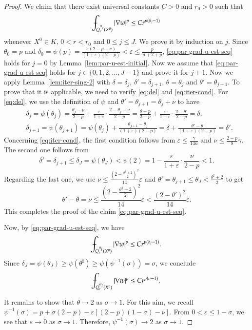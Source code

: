 \documentclass[11pt,oneside,english]{amsart}
\newcommand{\e}{\varepsilon}
\newcommand{\de}{\delta}
\newcommand{\D}{\nabla}
\numberwithin{equation}{section}
\def\Xint#1{\mathchoice
  {\XXint\displaystyle\textstyle{#1}}%
  {\XXint\textstyle\scriptstyle{#1}}%
  {\XXint\scriptstyle\scriptscriptstyle{#1}}%
  {\XXint\scriptscriptstyle\scriptscriptstyle{#1}}%
  \!\int}
\def\XXint#1#2#3{{\setbox0=\hbox{$#1{#2#3}{\int}$}
    \vcenter{\hbox{$#2#3$}}\kern-.5\wd0}}
\def\dashint{\Xint-}
\theoremstyle{plain}
\numberwithin{equation}{section}
\begin{document}
\begin{proof}
We claim that there exist universal constants $C>0$ and $r_0>0$ such that
\begin{align}
    \label{eq:par-grad-u-est-seq}
    \dashint_{Q_r^{\theta_j}(X^0)}|\D w|^p\le Cr^{p(\de_j-1)}
\end{align}
whenever $X^0\in K$, $0<r< r_0$ and $0\le j\le J$. We prove it by induction on $j$. Since $\theta_0=p$ and $\de_0=\psi(p)=\frac{\e(2-p-\nu)}{(1+\e)(2-p)}<\e\le \frac{p}{n+2+p}$, \eqref{eq:par-grad-u-est-seq} holds for $j=0$ by Lemma~\ref{lem:par-u-est-initial}. Now we assume that \eqref{eq:par-grad-u-est-seq} holds for $j\in \{0,1,2,\ldots,J-1\}$ and prove it for $j+1$. Now we apply Lemma~\ref{lem:iter-sing-2} with $\de=\de_j$, $\de'=\de_{j+1}$, $\theta=\theta_j$ and $\theta'=\theta_{j+1}$. To prove that it is applicable, we need to verify \eqref{eq:del} and \eqref{eq:iter-cond}. For \eqref{eq:del}, we use the definition of $\psi$ and $\theta'=\theta_{j+1}=\theta_j+\nu$ to have
\begin{align*}
    &\de_j=\psi(\theta_j)=\frac{\theta_j-p}{2-p}+\frac{\e}{1+\e}\cdot\frac{2-\theta_j-\nu}{2-p}=\frac{\theta-p}{2-p}+\frac{\e}{1+\e}\cdot\frac{2-\theta'}{2-p}=\de,\\
    &\de_{j+1}=\psi(\theta_{j+1})=\psi(\theta_j)+\frac{\theta_{j+1}-\theta_j}{(1+\e)(2-p)}=\de+\frac{\theta'-\theta}{(1+\e)(2-p)}=\de'.
\end{align*}
Concerning \eqref{eq:iter-cond}, the first condition follows from $\e\le \frac{\gamma}{14n}$  and $\nu\le \frac{2-p}8\gamma$. The second one follows from 
$$
\de'=\de_{j+1}\le \de_J=\psi(\theta_J)<\psi(2)=1-\frac{\e}{1+\e}\cdot\frac{\nu}{2-p}<1.
$$
Regarding the last one, we use $\nu\le\frac{\left(2-\frac{\theta^\sharp+2}2 \right)^2}{14}\e$ and $\theta'=\theta_{j+1}\le \theta_J<\frac{\theta^\sharp+2}2$ to get
$$
\theta'-\theta=\nu\le \frac{\left(2-\frac{\theta^\sharp+2}2 \right)^2}{14}\e<\frac{(2-\theta')^2}{14}\e.
$$
This completes the proof of the claim \eqref{eq:par-grad-u-est-seq}.

Now, by \eqref{eq:par-grad-u-est-seq}, we have
$$
\dashint_{Q_r^{\theta_J}(X^0)}|\D w|^p\le Cr^{p(\de_J-1)}.
$$
Since $\de_J=\psi(\theta_J)\ge \psi(\theta^\sharp)\ge \psi(\psi^{-1}(\sigma))=\sigma$, we conclude
$$
\dashint_{Q_r^{\theta_J}(X^0)}|\D w|^p\le Cr^{p(\sigma-1)}.
$$

 It remains to show that $\theta\to 2$ as $\sigma\to1$. For this aim, we recall $\psi^{-1}(\sigma)=p+\sigma(2-p)-\e[(2-p)(1-\sigma)-\nu]$. From $0<\e\le 1-\sigma$, we see that $\e\to0$ as $\sigma\to1$. Therefore, $\psi^{-1}(\sigma)\to2$ as $\sigma\to1$. 
\end{proof}
\end{document}
